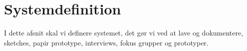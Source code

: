 \chapter{Systemdefinition}
I dette afsnit skal vi definere systemet, det gør vi ved at lave og dokumentere, sketches, papir prototype, interviews, fokus grupper og prototyper.